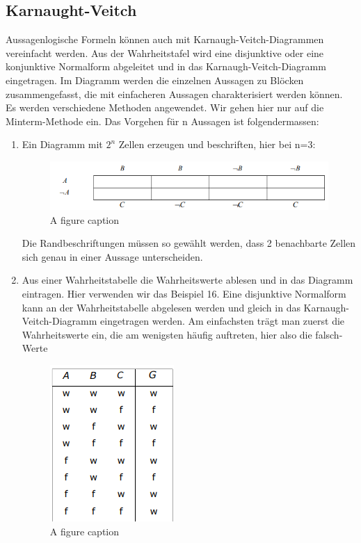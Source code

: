 \subsection{Karnaught-Veitch}
Aussagenlogische Formeln können auch mit Karnaugh-Veitch-Diagrammen vereinfacht 
werden. Aus der Wahrheitstafel wird eine disjunktive oder eine konjunktive Normalform 
abgeleitet und in das Karnaugh-Veitch-Diagramm eingetragen. Im Diagramm werden die 
einzelnen Aussagen zu Blöcken zusammengefasst, die mit einfacheren Aussagen charakterisiert werden können. Es werden verschiedene Methoden angewendet. Wir gehen hier 
nur auf die Minterm-Methode ein.
Das Vorgehen für n Aussagen ist folgendermassen: 
\begin{enumerate}
    \item Ein Diagramm mit \(2^n\) Zellen erzeugen und beschriften, hier bei n=3:
    \begin{figure}[H]
        \centering
        \includegraphics[width = 1 \linewidth]{kv-1.png}
        \caption{A figure caption}
    \end{figure}
    Die Randbeschriftungen müssen so gewählt werden, dass 2 benachbarte Zellen 
    sich genau in einer Aussage unterscheiden.
    \item Aus einer Wahrheitstabelle die Wahrheitswerte ablesen und in das Diagramm eintragen. Hier verwenden wir das Beispiel 16. Eine disjunktive Normalform kann an 
    der Wahrheitstabelle abgelesen werden und gleich in das Karnaugh-Veitch-Diagramm eingetragen werden. Am einfachsten trägt man zuerst die Wahrheitswerte 
    ein, die am wenigsten häufig auftreten, hier also die falsch-Werte
    \begin{figure}[H]
        \centering
        \includegraphics[width = .3 \linewidth]{kv-2.png}
        \caption{A figure caption}

\end{figure}
\end{enumerate}
